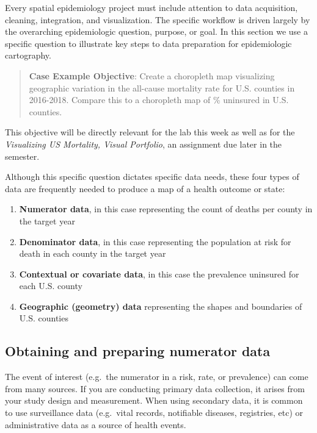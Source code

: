 \documentclass[
]{book}
\providecommand{\tightlist}{%
  \setlength{\itemsep}{0pt}\setlength{\parskip}{0pt}}
\begin{document}
Every spatial epidemiology project must include attention to data acquisition, cleaning, integration, and visualization. The specific workflow is driven largely by the overarching epidemiologic question, purpose, or goal. In this section we use a specific question to illustrate key steps to data preparation for epidemiologic cartography.

\begin{quote}
\textbf{Case Example Objective}: Create a choropleth map visualizing geographic variation in the all-cause mortality rate for U.S. counties in 2016-2018. Compare this to a choropleth map of \% uninsured in U.S. counties.
\end{quote}

This objective will be directly relevant for the lab this week as well as for the \emph{Visualizing US Mortality, Visual Portfolio}, an assignment due later in the semester.

Although this specific question dictates specific data needs, these four types of data are frequently needed to produce a map of a health outcome or state:

\begin{enumerate}
\def\labelenumi{\arabic{enumi}.}
\tightlist
\item
  \textbf{Numerator data}, in this case representing the count of deaths per county in the target year
\item
  \textbf{Denominator data}, in this case representing the population at risk for death in each county in the target year
\item
  \textbf{Contextual or covariate data}, in this case the prevalence uninsured for each U.S. county
\item
  \textbf{Geographic (geometry) data} representing the shapes and boundaries of U.S. counties
\end{enumerate}

\hypertarget{obtaining-and-preparing-numerator-data}{%
\subsection{Obtaining and preparing numerator data}\label{obtaining-and-preparing-numerator-data}}

The event of interest (e.g.~the numerator in a risk, rate, or prevalence) can come from many sources. If you are conducting primary data collection, it arises from your study design and measurement. When using secondary data, it is common to use surveillance data (e.g.~vital records, notifiable diseases, registries, etc) or administrative data as a source of health events.
\end{document}
